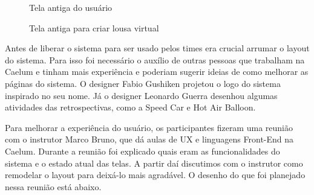 \begin{figure}[H]
  \centering
  \caption{Tela antiga do usuário}\label{figura:indexAntigo}
\end{figure}

\begin{figure}[H]
  \centering
  \caption{Tela antiga para criar lousa virtual}\label{figura:criarAntigo}
\end{figure}
Antes de liberar o sistema para ser usado pelos times era crucial arrumar o layout do sistema. Para isso foi necessário o auxílio de outras pessoas que trabalham na Caelum e tinham mais experiência e poderiam sugerir ideias de como melhorar as páginas do sistema. O designer Fabio Gushiken projetou o logo do sistema inspirado no seu nome. Já o designer Leonardo Guerra desenhou algumas atividades das retrospectivas, como a Speed Car e Hot Air Balloon.

Para melhorar a experiência do usuário, os participantes fizeram uma reunião com o instrutor Marco Bruno, que dá aulas de UX e linguagens Front-End na Caelum. Durante a reunião foi explicado quais eram as funcionalidades do sistema e o estado atual das telas. A partir daí discutimos com o instrutor como remodelar o layout para deixá-lo mais agradável. O desenho do que foi planejado nessa reunião está abaixo.

